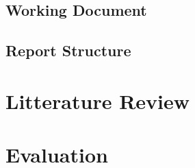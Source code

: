 \documentclass[a4paper]{memoir}
\begin{document}
\section{Working Document}

\section{Report Structure}

\chapter{Litterature Review}

\chapter{Evaluation}
\end{document}
